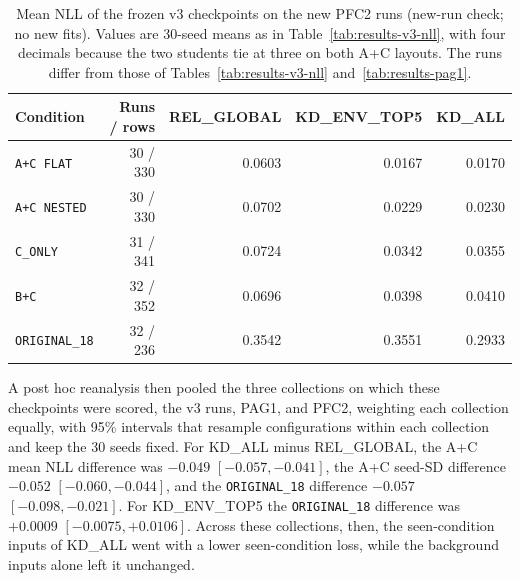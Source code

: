 \begin{table}[htbp]
\centering
\caption[Mean NLL of the frozen v3 checkpoints on the PFC2 runs]{Mean NLL of the frozen v3 checkpoints on the new PFC2 runs
(new-run check; no new fits). Values are 30-seed means as in
Table~\ref{tab:results-v3-nll}, with four decimals because the two
students tie at three on both A+C layouts. The runs differ from those
of Tables~\ref{tab:results-v3-nll} and~\ref{tab:results-pag1}.}
\label{tab:results-pfc2}
\small
\begin{tabular}{@{}lrrrr@{}}
\toprule
Condition & Runs / rows & REL\_GLOBAL & KD\_ENV\_TOP5 & KD\_ALL \\
\midrule
\texttt{A+C FLAT}     & 30 / 330 & 0.0603 & 0.0167 & 0.0170 \\
\texttt{A+C NESTED}   & 30 / 330 & 0.0702 & 0.0229 & 0.0230 \\
\texttt{C\_ONLY}      & 31 / 341 & 0.0724 & 0.0342 & 0.0355 \\
\texttt{B+C}          & 32 / 352 & 0.0696 & 0.0398 & 0.0410 \\
\texttt{ORIGINAL\_18} & 32 / 236 & 0.3542 & 0.3551 & 0.2933 \\
\bottomrule
\end{tabular}
\end{table}

A post hoc reanalysis then pooled the three collections on which these
checkpoints were scored, the v3 runs, PAG1, and PFC2, weighting each
collection equally, with 95\% intervals that resample configurations
within each collection and keep the 30 seeds fixed. For KD\_ALL minus
REL\_GLOBAL, the A+C mean NLL difference was $-0.049$
$[-0.057, -0.041]$, the A+C seed-SD difference $-0.052$
$[-0.060, -0.044]$, and the \texttt{ORIGINAL\_18} difference $-0.057$
$[-0.098, -0.021]$. For KD\_ENV\_TOP5 the \texttt{ORIGINAL\_18}
difference was $+0.0009$ $[-0.0075, +0.0106]$. Across these
collections, then, the seen-condition inputs of KD\_ALL went with a
lower seen-condition loss, while the background inputs alone left it
unchanged.




